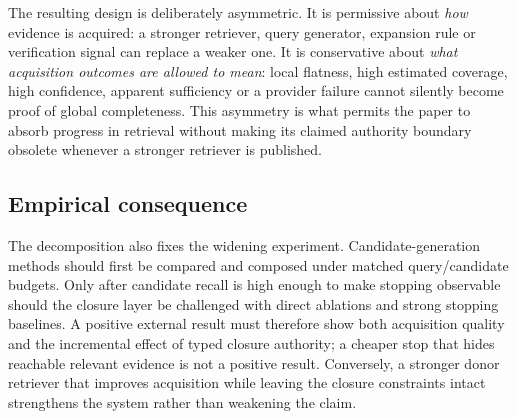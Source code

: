The resulting design is deliberately asymmetric.  It is permissive about
\emph{how} evidence is acquired: a stronger retriever, query generator,
expansion rule or verification signal can replace a weaker one.  It is
conservative about \emph{what acquisition outcomes are allowed to mean}: local
flatness, high estimated coverage, high confidence, apparent sufficiency or a
provider failure cannot silently become proof of global completeness.  This
asymmetry is what permits the paper to absorb progress in retrieval without
making its claimed authority boundary obsolete whenever a stronger retriever is
published.

\subsection{Empirical consequence}

The decomposition also fixes the widening experiment.  Candidate-generation
methods should first be compared and composed under matched query/candidate
budgets.  Only after candidate recall is high enough to make stopping observable
should the closure layer be challenged with direct ablations and strong stopping
baselines.  A positive external result must therefore show both acquisition
quality and the incremental effect of typed closure authority; a cheaper stop
that hides reachable relevant evidence is not a positive result.  Conversely,
a stronger donor retriever that improves acquisition while leaving the closure
constraints intact strengthens the system rather than weakening the claim.